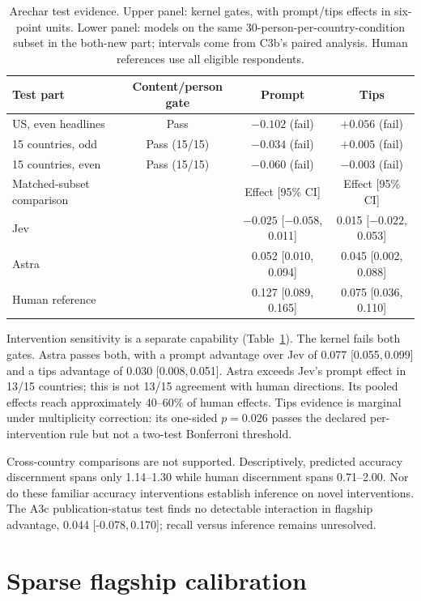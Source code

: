 \documentclass[11pt]{article}
\newcommand{\CI}[2]{[#1,\,#2]}
\begin{document}
\begin{table}[tp]
\centering\small
\caption{Arechar test evidence. Upper panel: kernel gates, with prompt/tips effects in six-point units. Lower panel: models on the same 30-person-per-country-condition subset in the both-new part; intervals come from C3b's paired analysis. Human references use all eligible respondents.}
\label{tab:arechar}
\begin{tabular}{lccc}
\toprule
Test part & Content/person gate & Prompt & Tips\\
\midrule
US, even headlines & Pass & $-0.102$ (fail) & $+0.056$ (fail)\\
15 countries, odd & Pass (15/15) & $-0.034$ (fail) & $+0.005$ (fail)\\
15 countries, even & Pass (15/15) & $-0.060$ (fail) & $-0.003$ (fail)\\
\midrule
Matched-subset comparison & & Effect [95\% CI] & Effect [95\% CI]\\
Jev & & $-0.025$ [$-0.058$, 0.011] & 0.015 [$-0.022$, 0.053]\\
Astra & & 0.052 [0.010, 0.094] & 0.045 [0.002, 0.088]\\
Human reference & & 0.127 [0.089, 0.165] & 0.075 [0.036, 0.110]\\
\bottomrule
\end{tabular}
\end{table}

Intervention sensitivity is a separate capability (Table~\ref{tab:arechar}). The kernel fails both gates. Astra passes both, with a prompt advantage over Jev of 0.077 \CI{0.055}{0.099} and a tips advantage of 0.030 \CI{0.008}{0.051}. Astra exceeds Jev's prompt effect in 13/15 countries; this is not 13/15 agreement with human directions. Its pooled effects reach approximately 40--60\% of human effects. Tips evidence is marginal under multiplicity correction: its one-sided $p=0.026$ passes the declared per-intervention rule but not a two-test Bonferroni threshold.

Cross-country comparisons are not supported. Descriptively, predicted accuracy discernment spans only 1.14--1.30 while human discernment spans 0.71--2.00. Nor do these familiar accuracy interventions establish inference on novel interventions. The A3c publication-status test finds no detectable interaction in flagship advantage, 0.044 \CI{-0.078}{0.170}; recall versus inference remains unresolved.

\section{Sparse flagship calibration}
\end{document}
